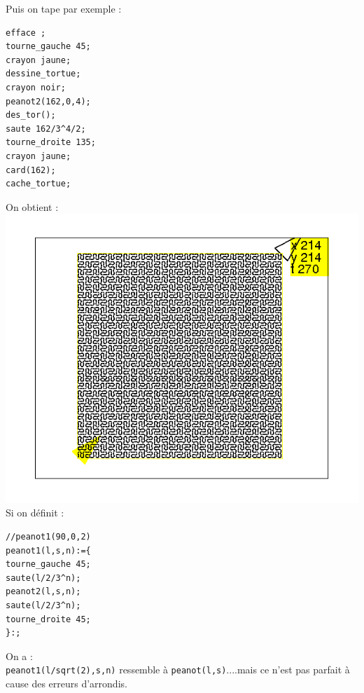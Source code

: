 \documentclass[a4paper,11pt]{book}
\begin{document}
Puis on tape par exemple :\\
\begin{verbatim}
efface ;
tourne_gauche 45;
crayon jaune;
dessine_tortue;
crayon noir;
peanot2(162,0,4);
des_tor();
saute 162/3^4/2;
tourne_droite 135;
crayon jaune;
card(162);
cache_tortue;
\end{verbatim}
On obtient :\\
\includegraphics[width=\textwidth]{tortpeant2}\\

Si on d\'efinit :\\
\begin{verbatim}
//peanot1(90,0,2)
peanot1(l,s,n):={
tourne_gauche 45;
saute(l/2/3^n);
peanot2(l,s,n);
saute(l/2/3^n);
tourne_droite 45;
}:;
\end{verbatim}
 On a :\\
{\tt peanot1(l/sqrt(2),s,n)} ressemble \`a {\tt peanot(l,s)}....mais ce n'est 
pas parfait \`a cause des erreurs d'arrondis.
\end{document}
